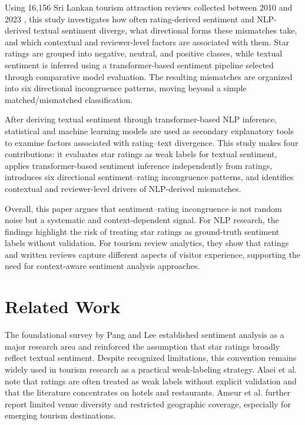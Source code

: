 \documentclass[conference]{IEEEtran}
\begin{document}
Using 16,156 Sri Lankan tourism attraction reviews collected between 2010 and 2023 \cite{Sewwandi}, this study investigates how often rating-derived sentiment and NLP-derived textual sentiment diverge, what directional forms these mismatches take, and which contextual and reviewer-level factors are associated with them. Star ratings are grouped into negative, neutral, and positive classes, while textual sentiment is inferred using a transformer-based sentiment pipeline selected through comparative model evaluation. The resulting mismatches are organized into six directional incongruence patterns, moving beyond a simple matched/mismatched classification.

After deriving textual sentiment through transformer-based NLP inference, statistical and machine learning models are used as secondary explanatory tools to examine factors associated with rating--text divergence. This study makes four contributions: it evaluates star ratings as weak labels for textual sentiment, applies transformer-based sentiment inference independently from ratings, introduces six directional sentiment--rating incongruence patterns, and identifies contextual and reviewer-level drivers of NLP-derived mismatches.

Overall, this paper argues that sentiment--rating incongruence is not random noise but a systematic and context-dependent signal. For NLP research, the findings highlight the risk of treating star ratings as ground-truth sentiment labels without validation. For tourism review analytics, they show that ratings and written reviews capture different aspects of visitor experience, supporting the need for context-aware sentiment analysis approaches.

\section{Related Work}
The foundational survey by Pang and Lee \cite{Pang} established sentiment analysis as a
major research area and reinforced the assumption that star ratings
broadly reflect textual sentiment. Despite recognized
limitations, this convention remains widely used in tourism research as a
practical weak-labeling strategy. Alaei et al. \cite{alaei} note that ratings are
often treated as weak labels without explicit validation and that the
literature concentrates on hotels and restaurants. Ameur et al. \cite{Ameur} further report limited venue
diversity and restricted geographic coverage, especially
for emerging tourism destinations.
\end{document}
